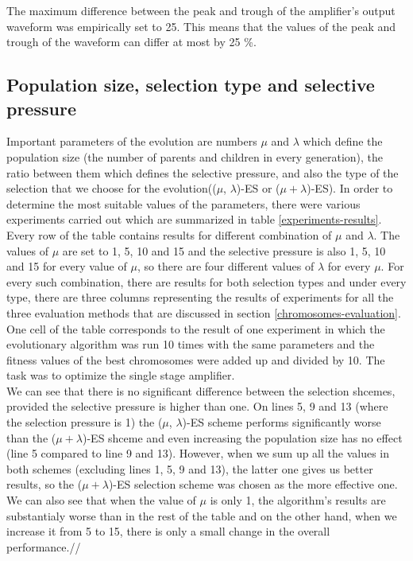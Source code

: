The maximum difference between the peak and trough of the amplifier's output waveform was empirically set to 25. This means that the values of the peak and trough of the waveform can differ at most by 25 \%.

\subsection{Population size, selection type and selective pressure}
Important parameters of the evolution are numbers $\mu$ and $\lambda$ which define the population size (the number of parents and children in every generation), the ratio between them which defines the selective pressure, and also the type of the selection that we choose for the evolution(($\mu$, $\lambda$)-ES or ($\mu + \lambda$)-ES). In order to determine the most suitable values of the parameters, there were various experiments carried out which are summarized in table \ref{experiments-results}.\\
Every row of the table contains results for different combination of $\mu$ and $\lambda$. The values of $\mu$ are set to 1, 5, 10 and 15 and the selective pressure is also 1, 5, 10 and 15 for every value of $\mu$, so there are four different values of $\lambda$ for every $\mu$. For every such combination, there are results for both selection types and under every type, there are three columns representing the results of experiments for all the three evaluation methods that are discussed in section \ref{chromosomes-evaluation}. One cell of the table corresponds to the result of one experiment in which the evolutionary algorithm was run 10 times with the same parameters and the fitness values of the best chromosomes were added up and divided by 10. The task was to optimize the single stage amplifier.\\
We can see that there is no significant difference between the selection shcemes, provided the selective pressure is higher than one. On lines 5, 9 and 13 (where the selection pressure is 1) the ($\mu$, $\lambda$)-ES scheme performs significantly worse than the ($\mu + \lambda$)-ES shceme and even increasing the population size has no effect (line 5 compared to line 9 and 13). However, when we sum up all the values in both schemes (excluding lines 1, 5, 9 and 13), the latter one gives us better results, so the ($\mu + \lambda$)-ES selection scheme was chosen as the more effective one.\\
We can also see that when the value of $\mu$ is only 1, the algorithm's results are substantialy worse than in the rest of the table and on the other hand, when we increase it from 5 to 15, there is only a small change in the overall performance.//
